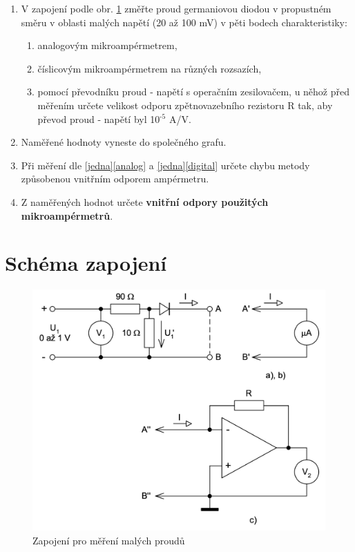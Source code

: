 \documentclass[a4paper,12pt]{article}   %
\newcommand{\texp}[1]{$^\textrm{#1}$}
\begin{document}
\label{zadani}
\begin{enumerate}
    \item V zapojení podle obr. \ref{fig:schema} změřte proud germaniovou diodou v propustném směru v oblasti malých napětí (20 až 100 mV) v pěti bodech charakteristiky:\label{jedna}
    \begin{enumerate}[label=\alph*)]
        \item analogovým mikroampérmetrem,\label{analog}
        \item číslicovým mikroampérmetrem na různých rozsazích,\label{digital}
        \item pomocí převodníku proud - napětí s operačním zesilovačem, u něhož před měřením určete velikost odporu zpětnovazebního rezistoru R tak, aby převod proud - napětí byl 10\texp{-5} A/V.
    \end{enumerate}
    \item Naměřené hodnoty vyneste do společného grafu.
    \item Při měření dle \ref{jedna}\ref{analog} a \ref{jedna}\ref{digital} určete chybu metody způsobenou vnitřním odporem ampérmetru.
    \item Z naměřených hodnot určete \textbf{vnitřní odpory použitých mikroampérmetrů}.
\end{enumerate}



\section{Schéma zapojení}

\label{schema_zapojeni}
\begin{figure}[h!]
    \centering
    \includegraphics[width=.8\textwidth]{schema.png}
    \caption{Zapojení pro měření malých proudů \cite{navod}}
    \label{fig:schema}
\end{figure}
\end{document}
